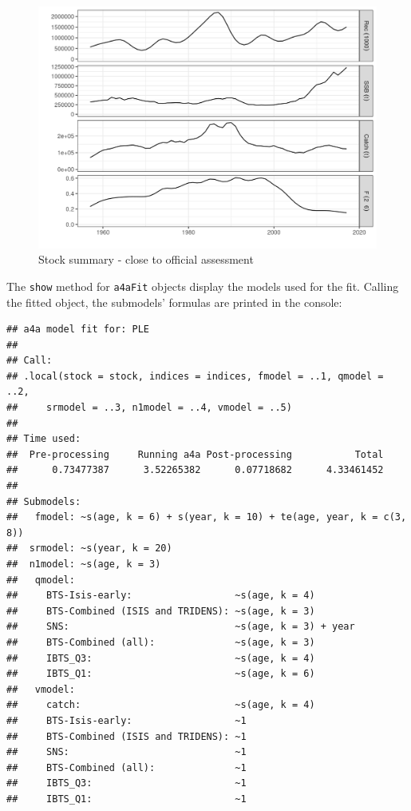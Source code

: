 \documentclass[
]{book}
\begin{document}
\begin{figure}
\centering
\includegraphics{_bookdown_files/_main_files/figure-html/plt02-1.png}
\caption{\label{fig:plt02}Stock summary - close to official assessment}
\end{figure}

The \texttt{show} method for \texttt{a4aFit} objects display the models used for the fit. Calling the fitted object, the submodels' formulas are printed in the console:

\begin{verbatim}
## a4a model fit for: PLE 
## 
## Call:
## .local(stock = stock, indices = indices, fmodel = ..1, qmodel = ..2, 
##     srmodel = ..3, n1model = ..4, vmodel = ..5)
## 
## Time used:
##  Pre-processing     Running a4a Post-processing           Total 
##      0.73477387      3.52265382      0.07718682      4.33461452 
## 
## Submodels:
##   fmodel: ~s(age, k = 6) + s(year, k = 10) + te(age, year, k = c(3, 8))
##  srmodel: ~s(year, k = 20)
##  n1model: ~s(age, k = 3)
##   qmodel:
##     BTS-Isis-early:                  ~s(age, k = 4)
##     BTS-Combined (ISIS and TRIDENS): ~s(age, k = 3)
##     SNS:                             ~s(age, k = 3) + year
##     BTS-Combined (all):              ~s(age, k = 3)
##     IBTS_Q3:                         ~s(age, k = 4)
##     IBTS_Q1:                         ~s(age, k = 6)
##   vmodel:
##     catch:                           ~s(age, k = 4)
##     BTS-Isis-early:                  ~1
##     BTS-Combined (ISIS and TRIDENS): ~1
##     SNS:                             ~1
##     BTS-Combined (all):              ~1
##     IBTS_Q3:                         ~1
##     IBTS_Q1:                         ~1
\end{verbatim}
\end{document}
